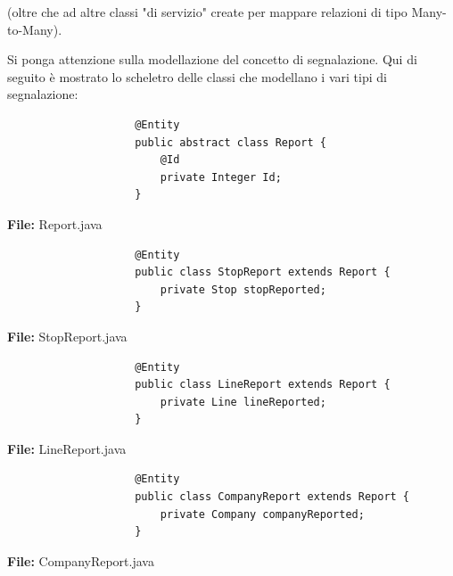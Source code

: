         (oltre che ad altre classi "di servizio" create per mappare relazioni di tipo Many-to-Many).

        Si ponga attenzione sulla modellazione del concetto di segnalazione. Qui di seguito è mostrato lo scheletro delle classi che modellano i vari tipi di segnalazione:
        
        \begin{framed}
            \begin{code}
                \begin{verbatim}
                    @Entity
                    public abstract class Report {
                        @Id 
                        private Integer Id;
                    }
                \end{verbatim}
                \caption{\textbf{File:} Report.java}
            \end{code}
        \end{framed}
        \begin{framed}
            \begin{code}
                \begin{verbatim}
                    @Entity
                    public class StopReport extends Report {        
                        private Stop stopReported;
                    }
                \end{verbatim}  
                \caption{\textbf{File:} StopReport.java}
            \end{code}
        \end{framed}
        \begin{framed}
            \begin{code}
                \begin{verbatim}
                    @Entity
                    public class LineReport extends Report {        
                        private Line lineReported;
                    }
                \end{verbatim}  
                \caption{\textbf{File:} LineReport.java}
            \end{code}
        \end{framed}
        \begin{framed}
            \begin{code}
                \begin{verbatim}
                    @Entity
                    public class CompanyReport extends Report {        
                        private Company companyReported;
                    }
                \end{verbatim}  
                \caption{\textbf{File:} CompanyReport.java}
            \end{code}
        \end{framed}
